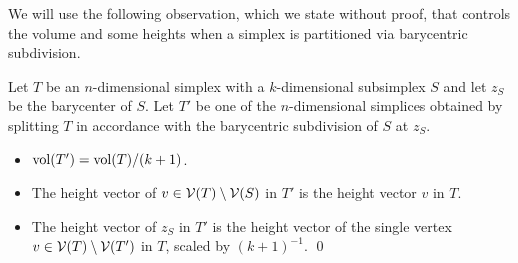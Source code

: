 \documentclass[10pt,a4paper]{article}
\begin{document}



We will use the following observation, which we state without proof, 
that controls the volume and some heights when a simplex is partitioned via barycentric subdivision.

\begin{lemma}\label{lemma:stardivision}
    Let $T$ be an $n$-dimensional simplex with a $k$-dimensional subsimplex $S$ and let $z_S$ be the barycenter of $S$. 
    Let $T'$ be one of the $n$-dimensional simplices obtained by splitting $T$ in accordance with the barycentric subdivision of $S$ at $z_{S}$.
    \begin{itemize}
        \item $\operatorname{vol}(T') = \operatorname{vol}(T) / (k+1)$. 
        \item The height vector of $v \in {\mathcal V}(T) \setminus {\mathcal V}(S)$ in $T'$ is the height vector $v$ in $T$.
        \item The height vector of $z_S$ in $T'$ is the height vector of the single vertex $v \in {\mathcal V}(T) \setminus {\mathcal V}(T')$ in $T$,
scaled by $(k+1)^{-1}$.
    \hfill\qed
    \end{itemize}
\end{lemma}
\end{document}
